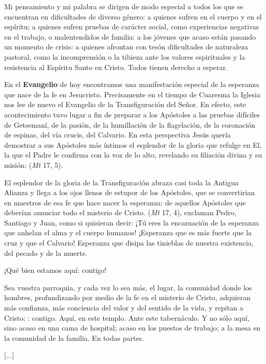 \begin{body}
Mi pensamiento y mi palabra se dirigen de modo especial a todos los que se encuentran en dificultades de diverso género: a quienes sufren en el cuerpo y en el espíritu; a quienes sufren pruebas de carácter social, como experiencias negativas en el trabajo, o malentendidos de familia: a los jóvenes que acaso están pasando un momento de crisis: a quienes afrontan con tesón dificultades de naturaleza pastoral, como la incomprensión o la tibieza ante los valores espirituales y la resistencia al Espíritu Santo en Cristo. Todos tienen derecho a esperar.

En el \textbf{Evangelio} de hoy encontramos una manifestación especial de la esperanza que nace de la fe en Jesucristo. Precisamente en el tiempo de Cuaresma la Iglesia nos lee de nuevo el Evangelio de la Transfiguración del Señor. En efecto, este acontecimiento tuvo lugar a fin de preparar a los Apóstoles a las pruebas difíciles de Getsemaní, de la pasión, de la humillación de la flagelación, de la coronación de espinas, del vía crucis, del Calvario. En esta perspectiva Jesús quería demostrar a sus Apóstoles más íntimos el esplendor de la gloria que refulge en El, la que el Padre le confirma con la voz de lo alto, revelando su filiación divina y su misión:  (\textit{Mt} 17, 5).

El esplendor de la gloria de la Transfiguración abraza casi toda la Antigua Alianza y llega a los ojos llenos de estupor de los Apóstoles, que se convertirían en maestros de esa fe que hace nacer la esperanza: de aquellos Apóstoles que deberían anunciar todo el misterio de Cristo.  (\textit{Mt} 17, 4), exclaman Pedro, Santiago y Juan, como si quisieran decir: ¡Tú eres la encarnación de la esperanza que anhelan el alma y el cuerpo humanos! ¡Esperanza que es más fuerte que la cruz y que el Calvario! Esperanza que disipa las tinieblas de nuestra existencia, del pecado y de la muerte.

¡Qué bien estamos aquí: contigo!

Sea vuestra parroquia, y cada vez lo sea más, el lugar, la comunidad donde los hombres, profundizando por medio de la fe en el misterio de Cristo, adquieran más confianza, más conciencia del valor y del sentido de la vida, y repitan a Cristo: : contigo. Aquí, en este templo. Ante este tabernáculo. Y no sólo aquí, sino acaso en una cama de hospital; acaso en los puestos de trabajo; a la mesa en la comunidad de la familia. En todas partes.

[...]
\end{body}

